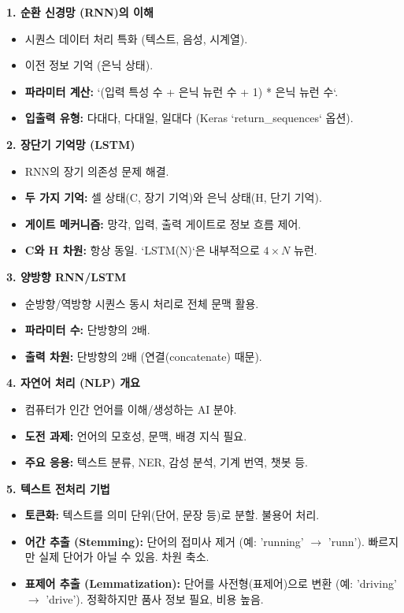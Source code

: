 \documentclass[11pt,a4paper]{article}
\begin{document}
\begin{tcolorbox}[title=\textbf{CSCI89 Lecture 3 핵심 요약}, colback=myblue!10!white, colframe=myblue!75!black, sharp corners, boxsep=3mm, left=3mm, right=3mm, top=3mm, bottom=3mm]
\textbf{1. 순환 신경망 (RNN)의 이해}
\begin{itemize}
    \item 시퀀스 데이터 처리 특화 (텍스트, 음성, 시계열).
    \item 이전 정보 기억 (은닉 상태).
    \item \textbf{파라미터 계산:} `(입력 특성 수 + 은닉 뉴런 수 + 1) * 은닉 뉴런 수`.
    \item \textbf{입출력 유형:} 다대다, 다대일, 일대다 (Keras `return_sequences` 옵션).
\end{itemize}

\textbf{2. 장단기 기억망 (LSTM)}
\begin{itemize}
    \item RNN의 장기 의존성 문제 해결.
    \item \textbf{두 가지 기억:} 셀 상태(C, 장기 기억)와 은닉 상태(H, 단기 기억).
    \item \textbf{게이트 메커니즘:} 망각, 입력, 출력 게이트로 정보 흐름 제어.
    \item \textbf{C와 H 차원:} 항상 동일. `LSTM(N)`은 내부적으로 $4 \times N$ 뉴런.
\end{itemize}

\textbf{3. 양방향 RNN/LSTM}
\begin{itemize}
    \item 순방향/역방향 시퀀스 동시 처리로 전체 문맥 활용.
    \item \textbf{파라미터 수:} 단방향의 2배.
    \item \textbf{출력 차원:} 단방향의 2배 (연결(concatenate) 때문).
\end{itemize}

\textbf{4. 자연어 처리 (NLP) 개요}
\begin{itemize}
    \item 컴퓨터가 인간 언어를 이해/생성하는 AI 분야.
    \item \textbf{도전 과제:} 언어의 모호성, 문맥, 배경 지식 필요.
    \item \textbf{주요 응용:} 텍스트 분류, NER, 감성 분석, 기계 번역, 챗봇 등.
\end{itemize}

\textbf{5. 텍스트 전처리 기법}
\begin{itemize}
    \item \textbf{토큰화:} 텍스트를 의미 단위(단어, 문장 등)로 분할. 불용어 처리.
    \item \textbf{어간 추출 (Stemming):} 단어의 접미사 제거 (예: 'running' $\rightarrow$ 'runn'). 빠르지만 실제 단어가 아닐 수 있음. 차원 축소.
    \item \textbf{표제어 추출 (Lemmatization):} 단어를 사전형(표제어)으로 변환 (예: 'driving' $\rightarrow$ 'drive'). 정확하지만 품사 정보 필요, 비용 높음.
\end{itemize}


\end{tcolorbox}
\end{document}
